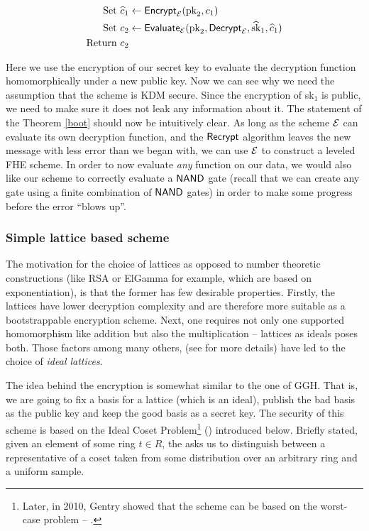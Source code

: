 \begin{align*}
	\text{Set } \widehat{c}_1 & \leftarrow \textsf{Encrypt}_{\mathcal{E}} (\text{pk}_2, c_1) \\
	\text{Set } c_2 & \leftarrow \textsf{Evaluate}_{\mathcal{E}} (\text{pk}_2, \textsf{Decrypt}_{\mathcal{E}}, \widehat{\text{sk}}_1, \widehat{c}_1) \\
	\text{Return } c_2 &
\end{align*}

Here we use the encryption of our secret key to evaluate the decryption function homomorphically under a new public key. Now we can see why we need the assumption that the scheme is KDM secure. Since the encryption of sk$_1$ is public, we need to make sure it does not leak any information about it. The statement of the Theorem \ref{boot} should now be intuitively clear. As long as the scheme $\mathcal{E}$ can evaluate its own decryption function, and the $\textsf{Recrypt}$ algorithm leaves the new message with less error than we began with, we can use $\mathcal{E}$ to construct a leveled FHE scheme. In order to now evaluate \textit{any} function on our data, we would also like our scheme to correctly evaluate a $\textsf{NAND}$ gate (recall that we can create any gate using a finite combination of $\textsf{NAND}$ gates) in order to make some progress before the error ``blows up''.

\subsubsection{Simple lattice based scheme}
The motivation for the choice of lattices as opposed to number theoretic constructions (like RSA or ElGamma for example, which are based on exponentiation), is that the former has few desirable properties. Firstly, the lattices have lower decryption complexity and are therefore more suitable as a bootstrappable encryption scheme. Next, one requires not only one supported homomorphism like addition but also the multiplication -- lattices as ideals poses both. Those factors among many others, (see \cite{gentry} for more details) have led to the choice of \textit{ideal lattices}.

The idea behind the encryption is somewhat similar to the one of GGH. That is, we are going to fix a basis for a lattice (which is an ideal), publish the bad basis as the public key and keep the good basis as a secret key. The security of this scheme is based on the Ideal Coset Problem\footnote{Later, in 2010, Gentry showed that the scheme can be based on the worst-case  problem -- \cite{worst-case}.} () introduced below. Briefly stated, given an element of some ring $t \in R$, the  asks us to distinguish between a representative of a coset taken from some distribution over an arbitrary ring and a uniform sample.

